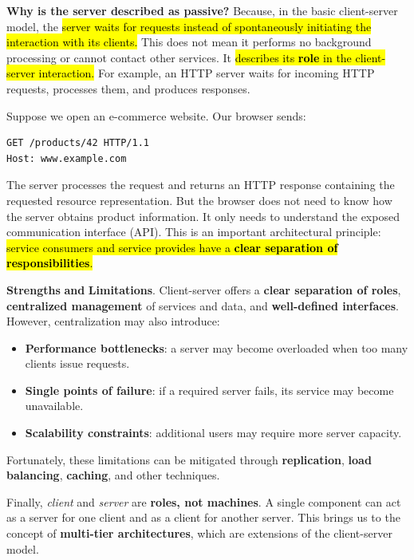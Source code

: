 \noindent
\textcolor{Green3}{ \textbf{Why is the server described as passive?}} Because, in the basic client-server model, the \hl{server waits for requests instead of spontaneously initiating the interaction with its clients.} This does not mean it performs no background processing or cannot contact other services. It \hl{describes its \textbf{role} in the client-server interaction.} For example, an HTTP server waits for incoming HTTP requests, processes them, and produces responses.

\highspace
\begin{examplebox}
    Suppose we open an e-commerce website. Our browser sends:
\begin{lstlisting}
GET /products/42 HTTP/1.1
Host: www.example.com
\end{lstlisting}
    The server processes the request and returns an HTTP response containing the requested resource representation. But the browser does not need to know how the server obtains product information. It only needs to understand the exposed communication interface (API). This is an important architectural principle: \hl{service consumers and service provides have a \textbf{clear separation of responsibilities}.}
\end{examplebox}
\noindent
\textcolor{Green3}{ \textbf{Strengths}} \textbf{and} \textcolor{Red2}{ \textbf{Limitations}}. Client-server offers a \textbf{clear separation of roles}, \textbf{centralized management} of services and data, and \textbf{well-defined interfaces}. However, centralization may also introduce:
\begin{itemize}
    \item \textbf{Performance bottlenecks}: a server may become overloaded when too many clients issue requests.
    \item \textbf{Single points of failure}: if a required server fails, its service may become unavailable.
    \item \textbf{Scalability constraints}: additional users may require more server capacity.
\end{itemize}
Fortunately, these limitations can be mitigated through \textbf{replication}, \textbf{load balancing}, \textbf{caching}, and other techniques.

\highspace
Finally, \emph{client} and \emph{server} are \textbf{roles, not machines}. A single component can act as a server for one client and as a client for another server. This brings us to the concept of \textbf{multi-tier architectures}, which are extensions of the client-server model.

